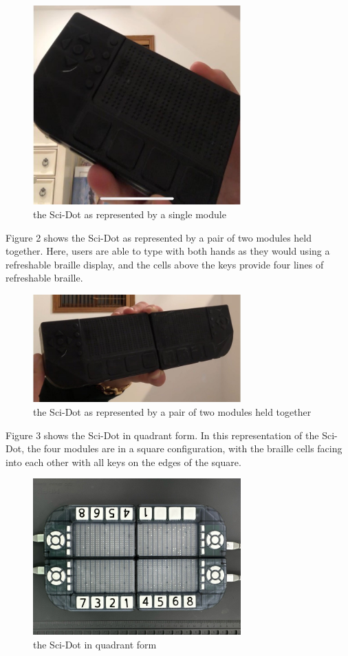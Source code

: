 \documentclass[11.5pt]{sig-alternate}
\begin{document}
\begin{large}
\pagebreak
\begin{figure}[htp]
    \centering
    \includegraphics[width=8cm]{figure 1.png}
 \caption{the Sci-Dot as represented by a single module }
    \label{the Sci-Dot as represented by a single module}
\end{figure}

Figure 2 shows the Sci-Dot as represented by a pair of two modules held together. Here, users are able to type with both hands as they would using a refreshable braille display, and the cells above the keys provide four lines of refreshable braille.

\begin{figure}[htp]
    \centering
    \includegraphics[width=8cm]{figure 2.png}
 \caption{the Sci-Dot as represented by a pair of two modules held together }
    \label{the Sci-Dot as represented by a pair of two modules held together}
\end{figure}

Figure 3 shows the Sci-Dot in quadrant form. In this representation of the Sci-Dot, the four modules are in a square configuration, with the braille cells facing into each other with all keys on the edges of the square. 

   \begin{figure}[htp]
    \centering
    \includegraphics[width=8cm]{figure 3.png}
 \caption{the Sci-Dot in quadrant form }
    \label{the Sci-Dot in quadrant form}
\end{figure}


\end{large}
\end{document}
